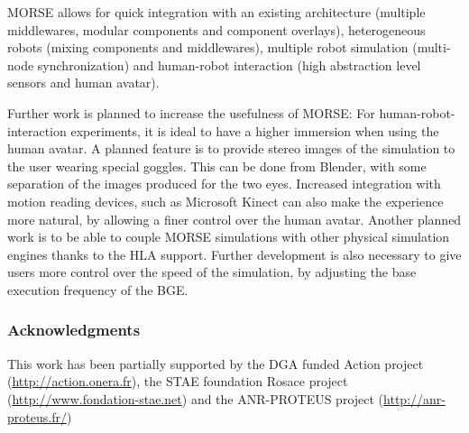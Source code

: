 \documentclass{llncs}
\begin{document}
MORSE allows for quick integration with an existing architecture (multiple
middlewares, modular components and component overlays), heterogeneous robots
(mixing components and middlewares), multiple robot simulation (multi-node
synchronization) and human-robot interaction (high abstraction level sensors
and human avatar).

Further work is planned to increase the usefulness of MORSE:
For human-robot-interaction experiments, it is ideal to have a higher
immersion when using the human avatar.  A planned feature is to provide stereo
images of the simulation to the user wearing special goggles. This can be done
from Blender, with some separation of the images produced for the two eyes.
Increased integration with motion reading devices, such as Microsoft Kinect can
also make the experience more natural, by allowing a finer control over the
human avatar.
Another planned work is to be able to couple MORSE simulations with
other physical simulation engines thanks to the HLA support.
Further development is also necessary to give users more control over the speed
of the simulation, by adjusting the base execution frequency of the BGE.

\subsubsection*{Acknowledgments}
This work has been partially supported by the DGA funded Action project
(\url{http://action.onera.fr}), the STAE foundation Rosace project
(\url{http://www.fondation-stae.net}) and the ANR-PROTEUS
project (\url{http://anr-proteus.fr/})


% 

\end{document}
